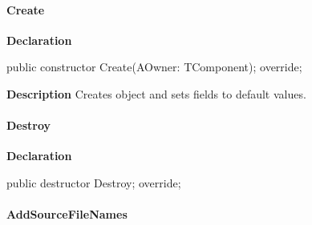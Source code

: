 \documentclass{report}
\newif\ifpdf
\begin{document}
\paragraph*{Create}\hspace*{\fill}

\label{PasDoc_Base.TPasDoc-Create}
\begin{list}{}{
\setlength{\itemindent}{0cm}
\setlength{\listparindent}{0cm}
\setlength{\leftmargin}{\evensidemargin}
\addtolength{\leftmargin}{\tmplength}
\settowidth{\labelsep}{X}
\addtolength{\leftmargin}{\labelsep}
\setlength{\labelwidth}{\tmplength}
}
\item[\textbf{Declaration}\hfill]
\ifpdf
\begin{flushleft}
\fi
\begin{ttfamily}
public constructor Create(AOwner: TComponent); override;\end{ttfamily}

\ifpdf
\end{flushleft}
\fi

\par
\item[\textbf{Description}]
Creates object and sets fields to default values.

\end{list}
\paragraph*{Destroy}\hspace*{\fill}

\label{PasDoc_Base.TPasDoc-Destroy}
\begin{list}{}{
\setlength{\itemindent}{0cm}
\setlength{\listparindent}{0cm}
\setlength{\leftmargin}{\evensidemargin}
\addtolength{\leftmargin}{\tmplength}
\settowidth{\labelsep}{X}
\addtolength{\leftmargin}{\labelsep}
\setlength{\labelwidth}{\tmplength}
}
\item[\textbf{Declaration}\hfill]
\ifpdf
\begin{flushleft}
\fi
\begin{ttfamily}
public destructor Destroy; override;\end{ttfamily}

\ifpdf
\end{flushleft}
\fi

\end{list}
\paragraph*{AddSourceFileNames}\hspace*{\fill}
\end{document}
